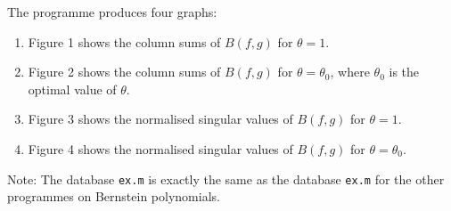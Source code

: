 \documentclass[a4paper,11pt]{article}
\begin{document}
The programme produces four  graphs:
%
\begin{enumerate}
\item{Figure 1 shows the column sums of $B(f,g)$ for $\theta=1$.}
\item{Figure 2 shows the column sums of $B(f,g)$ for $\theta=\theta_0$,
where $\theta_0$ is the optimal value of $\theta$.}
\item{Figure 3 shows the normalised singular values of $B(f,g)$ for $\theta=1$.}
\item{Figure 4 shows the normalised singular values of $B(f,g)$ for $\theta=\theta_0$.}
\end{enumerate}

Note: The database \texttt{ex.m} is exactly the same as
 the database \texttt{ex.m} for the other programmes on
 Bernstein polynomials.
\end{document}
